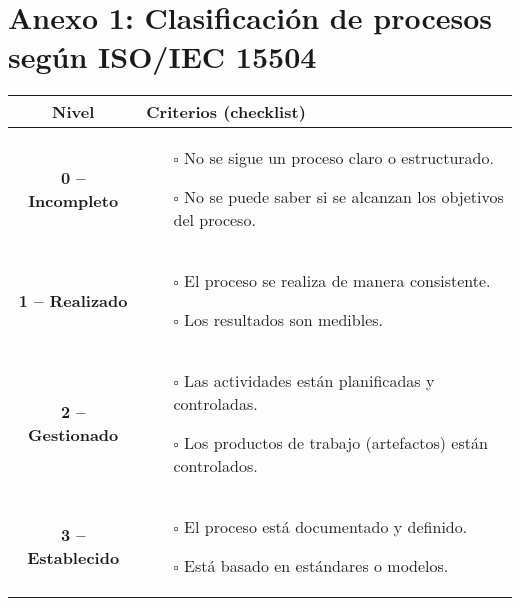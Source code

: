 
\clearpage

\section*{Anexo 1: Clasificación de procesos según ISO/IEC 15504}
\begin{table}[H]
    \centering
    \begin{tabular}{|c|p{12cm}|}
        \hline
        \textbf{Nivel} & \textbf{Criterios (checklist)} \\ \hline
        \textbf{0 – Incompleto} &
        \begin{itemize}
            \item[$\square$] No se sigue un proceso claro o estructurado.
            \item[$\square$] No se puede saber si se alcanzan los objetivos del proceso.
        \end{itemize} \\ \hline

        \textbf{1 – Realizado} &
        \begin{itemize}
            \item [$\square$] El proceso se realiza de manera consistente.
            \item [$\square$] Los resultados son medibles.
        \end{itemize} \\ \hline

        \textbf{2 – Gestionado} &
        \begin{itemize}
            \item[$\square$] Las actividades están planificadas y controladas.
            \item[$\square$] Los productos de trabajo (artefactos) están controlados.
        \end{itemize} \\ \hline

        \textbf{3 – Establecido} &
        \begin{itemize}
            \item[$\square$] El proceso está documentado y definido.
            \item[$\square$] Está basado en estándares o modelos.
        \end{itemize} \\ \hline


\end{tabular}
\end{table}
